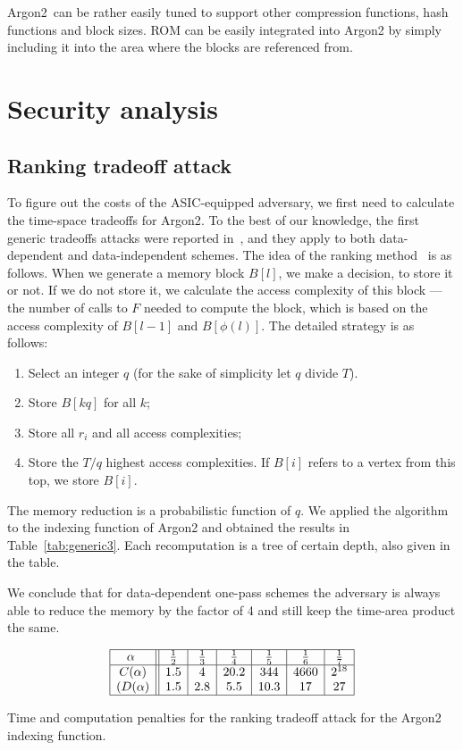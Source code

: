 \documentclass[a4paper]{article}
\begin{document}
Argon2\ can be rather easily tuned to support other compression functions, hash functions and block sizes.
ROM can be easily integrated into \textsf{Argon2} by simply including it into the area where the blocks are referenced from.


\section{Security analysis}





\subsection{Ranking tradeoff attack}\label{sec:tradeoff} To figure out the costs of the ASIC-equipped adversary, we first need to calculate the time-space tradeoffs for \textsf{Argon2}. To the best of our knowledge, the first generic
tradeoffs attacks were reported in~\cite{trade-att}, and they apply to both data-dependent and data-independent schemes. The idea of the ranking method~\cite{trade-att} is as follows. When we generate a memory block $B[l]$, we make a decision, to store it or not. If we do not store it, we calculate the access complexity of this block --- the number of calls to $F$ needed to compute the block, which is based on the access complexity of $B[l-1]$ and $B[\phi(l)]$. The detailed strategy is as follows:
 \begin{enumerate}
 \item Select an integer $q$ (for the sake of simplicity let $q$ divide $T$).
  \item Store $B[kq]$ for all $k$;
  \item Store all $r_i$ and all access complexities;
  \item Store the  $T/q$  highest access complexities. If $B[i]$ refers to a vertex from this top, we store $B[i]$.
\end{enumerate}
The memory reduction is a probabilistic function of $q$. We applied the algorithm  to the indexing function of \textsf{Argon2} and obtained the results in Table~\ref{tab:generic3}. Each recomputation is a tree of certain depth, also given in the table.

We conclude that for data-dependent one-pass schemes the adversary is always able to reduce the memory by the factor of 4 and still keep the time-area product the same.
\begin{table}[hb]
\renewcommand{\arraystretch}{1.3}
$$
\begin{array}{|c||c|c|c|c|c|c|c|c|}
\hline
\text{$\alpha$ } &\frac{1}{2} &\frac{1}{3} &\frac{1}{4} &\frac{1}{5} &\frac{1}{6} &\frac{1}{7}  \\
\hline
\text{$C(\alpha)$} &1.5& 4& 20.2& 344&  4660 &  2^{18}\\
\text{($D(\alpha)$} & 1.5 & 2.8 & 5.5 & 10.3 & 17 &27 \\
\hline
\end{array}
$$
\caption{Time and computation penalties for the ranking tradeoff attack for the Argon2 indexing function.}\label{tab:generic3}
\end{table}
\end{document}
